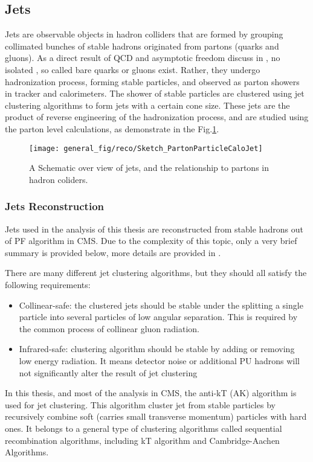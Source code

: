 \subsection{Jets}
Jets are observable objects in hadron colliders that are formed by grouping collimated bunches of stable hadrons originated from partons (quarks and gluons). As a direct result of QCD and asymptotic freedom discuss in , no isolated , so called bare quarks or gluons exist. Rather, they undergo hadronization process, forming stable particles, and observed as parton showers in tracker and calorimeters. The shower of stable particles are clustered using jet clustering algorithms to form jets with a certain cone size. These jets are the product of reverse engineering of the hadronization process, and are studied using the parton level calculations, as demonstrate in the Fig.\ref{fig:jets_cartoon}.

\begin{figure}
	\centering
	\texttt{[image: general\_fig/reco/Sketch\_PartonParticleCaloJet]}
	\caption[A Schematic over view of jets]{A Schematic over view of jets, and the relationship to partons in hadron coliders.\cite{Jet_cartoon}}
	\label{fig:jets_cartoon}
\end{figure}


\subsubsection*{Jets Reconstruction}
Jets used in the analysis of this thesis are reconstructed from stable hadrons out of PF algorithm in CMS. Due to the complexity of this topic, only a very brief summary is provided below, more details are provided in \cite{jet_ak,JEC_8TeV}.

There are many different jet clustering algorithms, but they should all satisfy the following requirements:
\begin{itemize}
	\item Collinear-safe: the clustered jets should be stable under the splitting a single particle into several particles of low angular separation. This is required by the common process of collinear gluon radiation.
	\item Infrared-safe: clustering algorithm should be stable by adding or removing low energy radiation. It means detector noise or additional PU hadrons will not significantly alter the result of jet clustering
\end{itemize}
In this thesis, and most of the analysis in CMS, the anti-kT (AK) algorithm is used for jet clustering. This algorithm cluster jet from stable particles by recursively combine soft (carries small transverse momentum) particles with hard ones. It belongs to a general type of clustering algorithms called sequential recombination algorithms, including kT algorithm and Cambridge-Aachen Algorithms.

